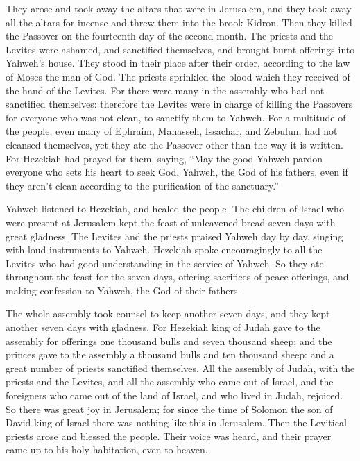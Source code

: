 {They arose and took away the altars that were in Jerusalem, and they took away all the altars for incense and threw them into the brook Kidron.
Then they killed the Passover on the fourteenth day of the second month. The priests and the Levites were ashamed, and sanctified themselves, and brought burnt offerings into Yahweh’s house.
They stood in their place after their order, according to the law of Moses the man of God. The priests sprinkled the blood which they received of the hand of the Levites.
For there were many in the assembly who had not sanctified themselves: therefore the Levites were in charge of killing the Passovers for everyone who was not clean, to sanctify them to Yahweh.
For a multitude of the people, even many of Ephraim, Manasseh, Issachar, and Zebulun, had not cleansed themselves, yet they ate the Passover other than the way it is written. For Hezekiah had prayed for them, saying, “May the good Yahweh pardon everyone
who sets his heart to seek God, Yahweh, the God of his fathers, even if they aren’t clean according to the purification of the sanctuary.”
\par }{\PP {}Yahweh listened to Hezekiah, and healed the people.
The children of Israel who were present at Jerusalem kept the feast of unleavened bread seven days with great gladness. The Levites and the priests praised Yahweh day by day, singing with loud instruments to Yahweh.
Hezekiah spoke encouragingly to all the Levites who had good understanding in the service of Yahweh. So they ate throughout the feast for the seven days, offering sacrifices of peace offerings, and making confession to Yahweh, the God of their fathers.
\par }{\PP {}The whole assembly took counsel to keep another seven days, and they kept another seven days with gladness.
For Hezekiah king of Judah gave to the assembly for offerings one thousand bulls and seven thousand sheep; and the princes gave to the assembly a thousand bulls and ten thousand sheep: and a great number of priests sanctified themselves.
All the assembly of Judah, with the priests and the Levites, and all the assembly who came out of Israel, and the foreigners who came out of the land of Israel, and who lived in Judah, rejoiced.
So there was great joy in Jerusalem; for since the time of Solomon the son of David king of Israel there was nothing like this in Jerusalem.
Then the Levitical priests arose and blessed the people. Their voice was heard, and their prayer came up to his holy habitation, even to heaven.

}
